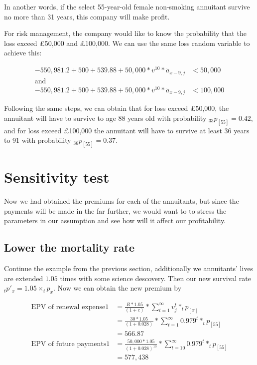 \documentclass{report}
\begin{document}
In another words, if the select 55-year-old female non-smoking annuitant survive no more than 31 years, this company will make profit. 

For risk management, the company would like to know the probability that the loss exceed \pounds50,000 and \pounds100,000. We can use the same loss random variable to achieve this:

 \begin{align*}
   -550,981.2 +500+ 539.88 + 50,000*v^{10}*\ddot{a}_{x-9,j}  &< 50,000 \\
\text{and}\\
-550,981.2 +500+ 539.88 + 50,000*v^{10}*\ddot{a}_{x-9,j}  &< 100,000 
\end{align*}

Following the same steps, we can obtain that for loss exceed \pounds50,000, the annuitant will have to survive to age 88 years old with probability $_{33}p_{[55]} = 0.42$, and for loss exceed \pounds100,000 the annuitant will have to survive at least 36 years to 91 with probability $_{36}p_{[55]} = 0.37$. 


\section{Sensitivity test}

Now we had obtained the premiums for each of the annuitants, but since the payments will be made in the far further, we would want to to stress the parameters in our assumption and see how will it affect our profitability.


\subsection{Lower the mortality rate}

Continue the example from the previous section, additionally we annuitants' lives are extended $1.05$ times with some science descovery. Then our new survival rate $_tp'_x = 1.05\times _tp_x$. Now we can obtain the new premium by 

\begin{align}
        \text{EPV of renewal expense1}&= \frac{R*1.05}{(1+c)} * \sum_{t=1}^{\infty} v_j^t * _tp_{[x]} \nonumber \\
         &= \frac{30*1.05}{(1+0.028)} * \sum_{t=1}^{\infty} 0.979^t * _tp_{[55]} \nonumber\\
         &= 566.87\nonumber\\
        \text{EPV of future payments1} &= \frac{50,000*1.05}{(1+0.028)^{10}} * \sum_{t=10}^{\infty} 0.979^t * _tp_{[55]} \nonumber\\ 
         &=577,438 \nonumber
\end{align}
\end{document}
